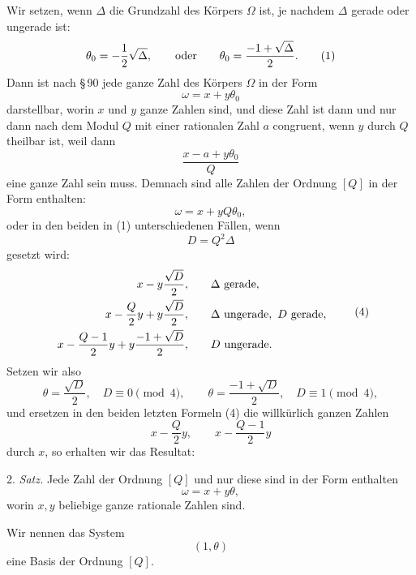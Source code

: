 \documentclass[11pt]{article}
\begin{document}
Wir setzen, wenn $\Delta$ die Grundzahl des Körpers $\Omega$ ist, je nachdem $\Delta$ gerade oder ungerade ist:
\begin{equation}
 \theta_0=-\frac{1}{2}\sqrt{\Delta},
 \qquad\hbox{oder}\qquad
 \theta_0=\frac{-1+\sqrt{\Delta}}{2}.
\tag{1}
\end{equation}
Dann ist nach \S\,90 jede ganze Zahl des Körpers $\Omega$ in der Form
\begin{equation}
 \omega=x+y\theta_0
\tag{2}
\end{equation}
darstellbar, worin $x$ und $y$ ganze Zahlen sind, und diese Zahl ist dann und nur dann nach dem Modul $Q$ mit einer rationalen Zahl $a$ congruent, wenn $y$ durch $Q$ theilbar ist, weil dann
\[
 \frac{x-a+y\theta_0}{Q}
\]
eine ganze Zahl sein muss. Demnach sind alle Zahlen der Ordnung $[Q]$ in der Form enthalten:
\[
 \omega=x+yQ\theta_0,
\]
oder in den beiden in (1) unterschiedenen Fällen, wenn
\begin{equation}
 D=Q^2\Delta
\tag{3}
\end{equation}
gesetzt wird:
\begin{equation}
\begin{array}{rll}
 x-y\dfrac{\sqrt D}{2}, && \Delta\hbox{ gerade},\\[0.7em]
 x-\dfrac{Q}{2}y+y\dfrac{\sqrt D}{2}, && \Delta\hbox{ ungerade},\ D\hbox{ gerade},\\[0.7em]
 x-\dfrac{Q-1}{2}y+y\dfrac{-1+\sqrt D}{2}, && D\hbox{ ungerade}.
\end{array}
\tag{4}
\end{equation}
Setzen wir also
\begin{equation}
 \theta=\frac{\sqrt D}{2},\quad D\equiv0\pmod4,
 \qquad
 \theta=\frac{-1+\sqrt D}{2},\quad D\equiv1\pmod4,
\tag{5}
\end{equation}
und ersetzen in den beiden letzten Formeln (4) die willkürlich ganzen Zahlen
\[
 x-\frac{Q}{2}y,
 \qquad x-\frac{Q-1}{2}y
\]
durch $x$, so erhalten wir das Resultat:

2. \emph{Satz.} Jede Zahl der Ordnung $[Q]$ und nur diese sind in der Form enthalten
\begin{equation}
 \omega=x+y\theta,
\tag{6}
\end{equation}
worin $x,y$ beliebige ganze rationale Zahlen sind.

Wir nennen das System
\begin{equation}
 (1,\theta)
\tag{7}
\end{equation}
eine Basis der Ordnung $[Q]$.
\end{document}
